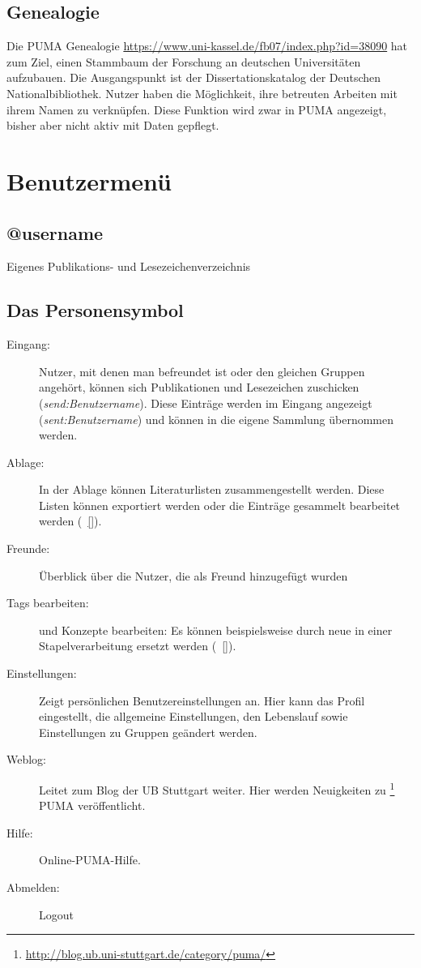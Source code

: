 \subsection{Genealogie}
\label{subsec:genealogie}
Die PUMA Genealogie \href{https://www.uni-kassel.de/fb07/index.php?id=38090}{https://www.uni-kassel.de/fb07/index.php?id=38090} hat zum Ziel, einen Stammbaum der Forschung an deutschen Universitäten aufzubauen. Die Ausgangspunkt ist der Dissertationskatalog der Deutschen Nationalbibliothek. Nutzer haben die Möglichkeit, ihre betreuten Arbeiten mit ihrem Namen zu verknüpfen. Diese Funktion wird zwar in PUMA angezeigt, bisher aber nicht aktiv mit Daten gepflegt.

\section{Benutzermenü}
\label{sec:benutzermenue}
\subsection{@username}
\label{subsec:username}
Eigenes Publikations- und Lesezeichenverzeichnis
\subsection{Das Personensymbol}
\label{subsec:Personensymbol}
\begin{description}
\item[Eingang:] Nutzer, mit denen man befreundet ist oder den gleichen Gruppen angehört, können sich Publikationen und Lesezeichen zuschicken (\tag \textit{send:Benutzername}). Diese Einträge werden im Eingang angezeigt (\tag \textit{sent:Benutzername}) und können in die eigene Sammlung übernommen werden.
\item [Ablage:] In der Ablage können Literaturlisten zusammengestellt werden. Diese Listen können exportiert werden oder die Einträge gesammelt bearbeitet werden (~\autoref{}). 
\item [Freunde:] Überblick über die Nutzer, die als Freund hinzugefügt wurden 
\item [Tags bearbeiten:] \tags und Konzepte bearbeiten: Es können beispielsweise \tags durch neue in einer Stapelverarbeitung ersetzt werden (~\autoref{}).
\item [Einstellungen:] Zeigt persönlichen Benutzereinstellungen an. Hier kann das Profil eingestellt, die allgemeine Einstellungen, den Lebenslauf sowie Einstellungen zu Gruppen geändert werden.
\item [Weblog:] Leitet zum Blog der UB Stuttgart weiter. Hier werden Neuigkeiten zu \footnote{\url{http://blog.ub.uni-stuttgart.de/category/puma/}} PUMA veröffentlicht.
\item [Hilfe:] Online-PUMA-Hilfe.
\item [Abmelden:] Logout 
\end{description}


